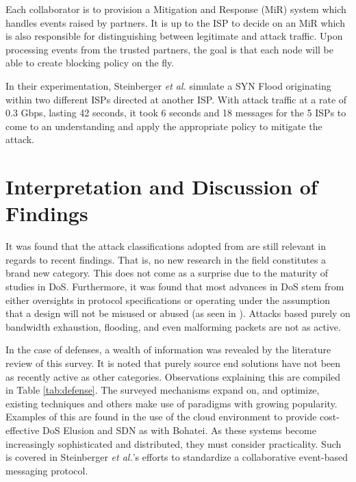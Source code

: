 \documentclass[conference]{IEEEtran}
\begin{document}
Each collaborator is to provision a Mitigation and Response (MiR) system which handles events raised by partners. It is up to the ISP to decide on an MiR which is also responsible for distinguishing between legitimate and attack traffic. Upon processing events from the trusted partners, the goal is that each node will be able to create blocking policy on the fly.

In their experimentation, Steinberger \textit{et al.} simulate a SYN Flood originating within two different ISPs directed at another ISP. With attack traffic at a rate of 0.3 Gbps, lasting 42 seconds, it took 6 seconds and 18 messages for the 5 ISPs to come to an understanding and apply the appropriate policy to mitigate the attack.

\section{Interpretation and Discussion of Findings}

It was found that the attack classifications adopted from \cite{Botnet:Hoque,Zargar:DDOSFlood} are still relevant in regards to recent findings. That is, no new research in the field constitutes a brand new category. This does not come as a surprise due to the maturity of studies in DoS. Furthermore, it was found that most advances in DoS stem from either oversights in protocol specifications or operating under the assumption that a design will not be misused or abused (as seen in \cite{DoSTCPAnalysis:Schuba,Li:LAAEM,OffPath:Cao}). Attacks based purely on bandwidth exhaustion, flooding, and even malforming packets are not as active.

In the case of defenses, a wealth of information was revealed by the literature review of this survey. It is noted that purely source end solutions have not been as recently active as other categories. Observations explaining this are compiled in Table \ref{tab:defense}. The surveyed mechanisms expand on, and optimize, existing techniques and others make use of paradigms with growing popularity. Examples of this are found in the use of the cloud environment to provide cost-effective DoS Elusion and SDN as with Bohatei. As these systems become increasingly sophisticated and distributed, they must consider practicality. Such is covered in Steinberger \textit{et al.}'s efforts to standardize a collaborative event-based messaging protocol.

\end{document}
